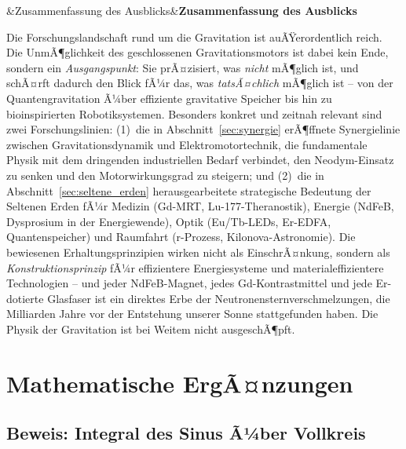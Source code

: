 ﻿\documentclass[12pt, a4paper]{report}
\newenvironment{hinweis}[1][]{%
  \begin{hinweisframe}\sloppy%
  \ifx&#1&\else\textbf{#1}\par\smallskip\fi}{\end{hinweisframe}}
\theoremstyle{definition}
\theoremstyle{remark}
\begin{document}
\begin{hinweis}[Zusammenfassung des Ausblicks]
  Die Forschungslandschaft rund um die Gravitation ist auÃŸerordentlich reich.
  Die UnmÃ¶glichkeit des geschlossenen Gravitationsmotors ist dabei kein Ende,
  sondern ein \emph{Ausgangspunkt}: Sie prÃ¤zisiert, was \emph{nicht} mÃ¶glich ist,
  und schÃ¤rft dadurch den Blick fÃ¼r das, was \emph{tatsÃ¤chlich} mÃ¶glich ist --
  von der Quantengravitation Ã¼ber effiziente gravitative Speicher bis hin zu
  bioinspirierten Robotiksystemen. Besonders konkret und zeitnah relevant sind
  zwei Forschungslinien: (1)~die in Abschnitt~\ref{sec:synergie} erÃ¶ffnete
  Synergielinie zwischen Gravitationsdynamik und Elektromotortechnik, die
  fundamentale Physik mit dem dringenden industriellen Bedarf verbindet,
  den Neodym-Einsatz zu senken und den Motorwirkungsgrad zu steigern; und
  (2)~die in Abschnitt~\ref{sec:seltene_erden} herausgearbeitete strategische
  Bedeutung der Seltenen Erden fÃ¼r Medizin (Gd-MRT, Lu-177-Theranostik),
  Energie (NdFeB, Dysprosium in der Energiewende), Optik (Eu/Tb-LEDs,
  Er-EDFA, Quantenspeicher) und Raumfahrt (r-Prozess, Kilonova-Astronomie).
  Die bewiesenen Erhaltungsprinzipien wirken nicht als EinschrÃ¤nkung, sondern
  als \emph{Konstruktionsprinzip} fÃ¼r effizientere Energiesysteme und
  materialeffizientere Technologien -- und jeder NdFeB-Magnet, jedes
  Gd-Kontrastmittel und jede Er-dotierte Glasfaser ist ein direktes Erbe
  der Neutronensternverschmelzungen, die Milliarden Jahre vor der Entstehung
  unserer Sonne stattgefunden haben.
  Die Physik der Gravitation ist bei Weitem nicht ausgeschÃ¶pft.
\end{hinweis}

\appendix
\chapter{Mathematische ErgÃ¤nzungen}
\label{app:math}

\section{Beweis: Integral des Sinus Ã¼ber Vollkreis}
\end{document}
